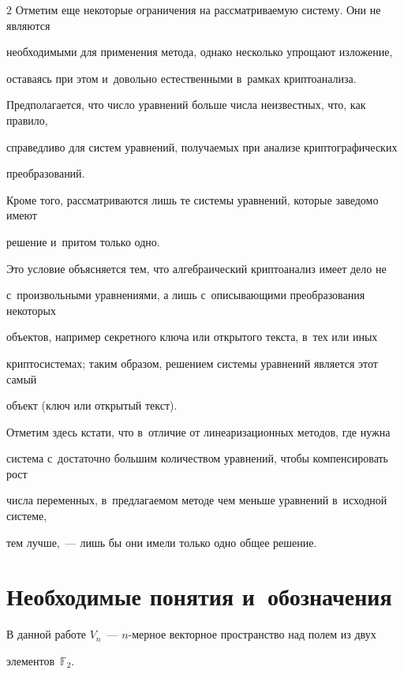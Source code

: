 \begin{multicols}{2}
Отметим еще некоторые ограничения на рассматриваемую систему. Они не являются 


необходимыми для применения метода, однако несколько упрощают изложение, 


оставаясь при этом и~довольно естественными в~рамках криптоанализа.


Предполагается, что число уравнений больше чис\-ла неизвестных, что, как правило, 


справедливо для сис\-тем уравнений, получаемых при анализе крип\-то\-гра\-фи\-че\-ских 


преобразований.


Кроме того, рас\-смат\-ри\-ва\-ют\-ся лишь те системы уравнений, которые заведомо имеют 


решение и~притом только одно.


Это условие объясняется тем, что алгебраический крип\-то\-ана\-лиз имеет дело не 


с~произвольными уравнениями, а лишь с~описывающими преобразования некоторых 


объектов, например секретного ключа или открытого текста, в~тех или иных 


криптосистемах; таким образом, решением системы уравнений является этот самый 


объект (ключ или открытый текст).


Отметим здесь кстати, что в~отличие от линеаризационных методов, где нужна 


система с~достаточно большим количеством уравнений, чтобы компенсировать рост 


числа переменных, в~предлагаемом методе чем меньше уравнений в~исходной системе, 


тем лучше,~--- лишь бы они имели только одно общее решение.








\section{Необходимые понятия и~обозначения}





В данной работе $V_n$~--- $n$-мер\-ное векторное пространство над полем из двух 


элементов~$\mathbb{F}_2$.





\end{multicols}
